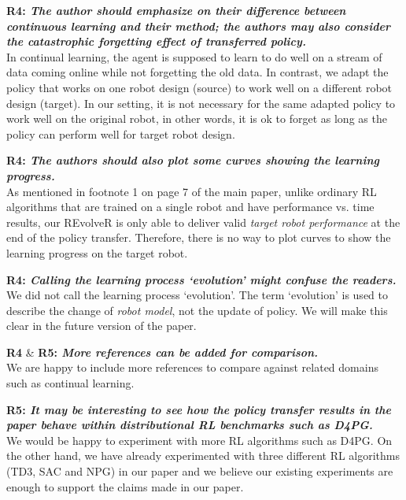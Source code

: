 \documentclass[nohyperref]{article}
\theoremstyle{plain}
\theoremstyle{definition}
\theoremstyle{remark}
\begin{document}
\textbf{\textcolor{viz_yellow}{R4}: \textit{The author should emphasize on their difference between continuous learning and their method; the authors may also consider the catastrophic forgetting effect of transferred policy.}} \\
In continual learning, the agent is supposed to learn to do well on a stream of data coming online while not forgetting the old data.
In contrast, we adapt the policy that works on one robot design (source) to work well on a different robot design (target). In our setting, it is not necessary for the same adapted policy to work well on the original robot, in other words, it is ok to forget as long as the policy can perform well for target robot design.


\textbf{\textcolor{viz_yellow}{R4}: \textit{The authors should also plot some curves showing the learning progress.}} \\
As mentioned in %
footnote 1 on page 7 of the main paper,
unlike ordinary RL algorithms that are trained on a single robot and have performance vs. time results, our REvolveR is only able to deliver valid \emph{target robot performance} at the end of the policy transfer.
Therefore, there is no way to plot curves to show the learning progress on the target robot.

\textbf{\textcolor{viz_yellow}{R4}: \textit{Calling the learning process `evolution' might confuse the readers.}} \\
We did not call the learning process `evolution'.
The term `evolution' is used to describe the change of \emph{robot model}, not the update of policy.
We will make this clear in the future version of the paper.

\textbf{\textcolor{viz_yellow}{R4}} \& \textbf{\textcolor{viz_green}{R5}: \textit{More references can be added for comparison.}} \\
We are happy to include more references to compare against related domains such as continual learning.

\textbf{\textcolor{viz_green}{R5}: \textit{It may be interesting to see how the policy transfer results in the paper behave within distributional RL benchmarks such as D4PG.}} \\
We would be happy to experiment with more RL algorithms such as D4PG.
On the other hand, we have already experimented with three different RL algorithms (TD3, SAC and NPG) in our paper and we believe our existing experiments are enough to support the claims made in our paper.



{\small


}

\end{document}
